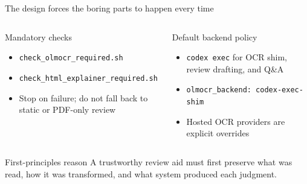 \documentclass[aspectratio=169,professionalfonts]{beamer}
\newcommand{\artifact}[1]{\texttt{\footnotesize #1}}
\begin{document}
\begin{frame}{The design forces the boring parts to happen every time}
  \begin{columns}[T,onlytextwidth]
      \begin{block}{Mandatory checks}
        \begin{itemize}
          \item \artifact{check\_olmocr\_required.sh}
          \item \artifact{check\_html\_explainer\_required.sh}
          \item Stop on failure; do not fall back to static or PDF-only review
        \end{itemize}
      \end{block}
      \begin{block}{Default backend policy}
        \begin{itemize}
          \item \artifact{codex exec} for OCR shim, review drafting, and Q\&A
          \item \artifact{olmocr\_backend: codex-exec-shim}
          \item Hosted OCR providers are explicit overrides
        \end{itemize}
      \end{block}
  \end{columns}

  \vspace{0.5em}
  \begin{block}{First-principles reason}
    A trustworthy review aid must first preserve what was read, how it was
    transformed, and what system produced each judgment.
  \end{block}

\end{frame}
\end{document}
